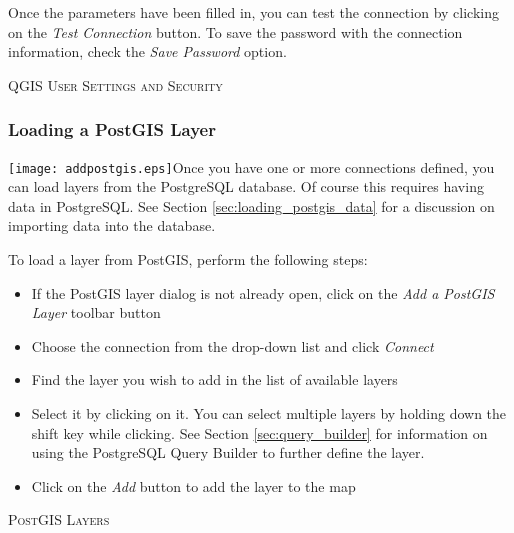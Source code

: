 Once the parameters have been filled in, you can test the connection by
clicking on the \textsl{Test
Connection} button. To save the password
with the connection information, check the \textsl{Save Password} option.

\begin{Tip}\caption{\textsc{QGIS User Settings and
Security}}
\end{Tip}

\subsubsection{Loading a PostGIS Layer}

\texttt{[image: addpostgis.eps]}Once you have one or more
connections defined, you can load layers from the PostgreSQL database. Of
course this requires having data in PostgreSQL. See Section
\ref{sec:loading_postgis_data} for a discussion on importing data into the
database. 

To load a layer from PostGIS, perform the following steps:

\begin{itemize}
\item If the PostGIS layer dialog is not already open, click on the
\textit{Add a PostGIS Layer} toolbar button
\item Choose the connection from the drop-down list and click \textsl{Connect}
\item Find the layer you wish to add in the list of available layers
\item Select it by clicking on it. You can select multiple layers by holding
down the shift key while clicking. See Section \ref{sec:query_builder} for
information on using the PostgreSQL Query Builder to further define the layer.
\item Click on the \textsl{Add} button to add the layer to the map
\end{itemize}

\begin{Tip}\caption{\textsc{PostGIS Layers}}
\end{Tip}

